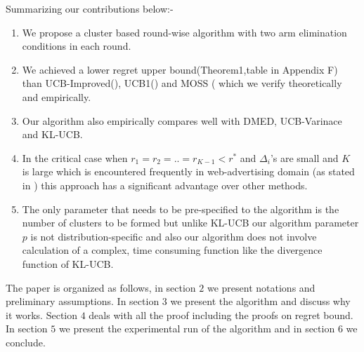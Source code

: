 	Summarizing our contributions below:-
\begin{enumerate}
\item We propose a cluster based round-wise algorithm with two arm elimination conditions in each round.
\item We achieved a lower regret upper bound(Theorem1,table in Appendix F) than UCB-Improved(\cite{auer2010ucb}), UCB1(\cite{auer2002finite}) and  MOSS (\cite{audibert2009minimax} which we verify theoretically and empirically.
\item Our algorithm also empirically compares well with DMED, UCB-Varinace and KL-UCB.
\item In the critical case when $r_{1}=r_{2}=..=r_{K-1}<r^{*}$ and $\Delta_{i}$'s are small and $K$ is large which is encountered frequently in web-advertising domain (as stated in \cite{garivier2011kl}) this approach has a significant advantage over other methods.
\item The only parameter that needs to be pre-specified to the algorithm is the number of clusters to be formed but unlike KL-UCB our algorithm parameter $p$ is not distribution-specific and also our algorithm does not involve calculation of a complex, time consuming function like the divergence function of KL-UCB.
\end{enumerate}
	
	The paper is organized as follows, in section $2$ we present notations and preliminary assumptions. In section $3$ we present the algorithm and discuss why it works. Section $4$ deals with all the proof including the proofs on regret bound. In section $5$ we present the experimental run of the algorithm and in section $6$ we conclude. 
